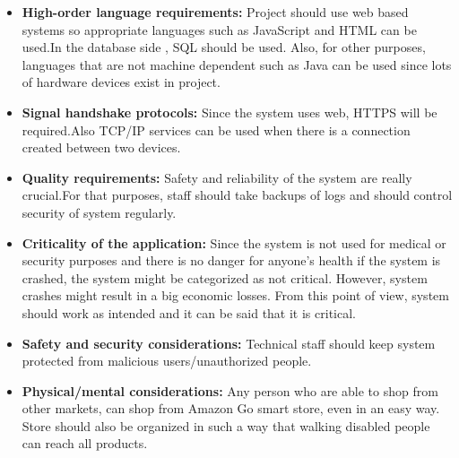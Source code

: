 \begin{itemize}
    \item\textbf{High-order language requirements:} Project should use web based systems so appropriate languages such as JavaScript and HTML can be used.In the database side , SQL should be used. Also, for other purposes, languages that are not machine dependent such as Java can be used since lots of hardware devices exist in project.
    \item\textbf{Signal handshake protocols:} Since the system uses web, HTTPS will be required.Also TCP/IP services can be used when there is a connection created between two devices.
    \item\textbf{Quality requirements:} Safety and reliability of the system are really crucial.For that purposes, staff should take backups of logs and should control security of system regularly.
    \item\textbf{Criticality of the application:} Since the system is not used for medical or security purposes and there is no danger for anyone's health if the system is crashed, the system might be categorized as not critical. However, system crashes might result in a big economic losses. From this point of view, system should work as intended and it can be said that it is critical.
    \item\textbf{Safety and security considerations:} Technical staff should keep
    system protected from malicious users/unauthorized people.
    \item\textbf{Physical/mental considerations:} Any person who are able to shop
    from other markets, can shop from Amazon Go smart store, even in an easy way. Store should also be organized in such a way that walking disabled people can reach all products. 
\end{itemize}


